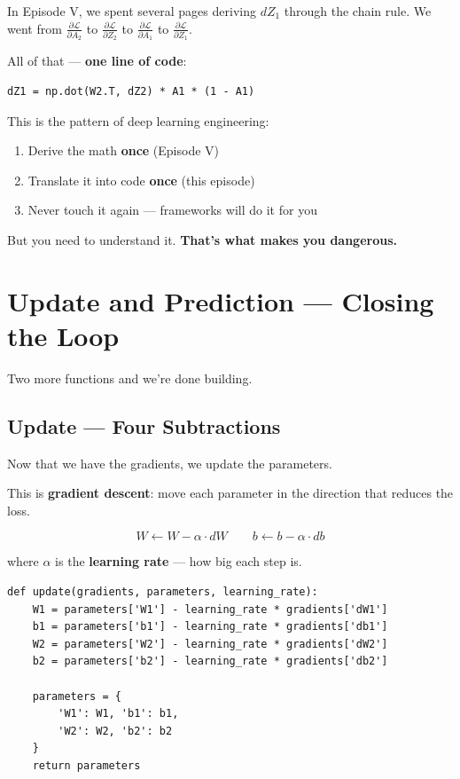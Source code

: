 \documentclass[11pt]{article}
\begin{document}
In Episode V, we spent several pages deriving $dZ_1$ through the chain rule.
We went from $\frac{\partial \mathcal{L}}{\partial A_2}$ to $\frac{\partial \mathcal{L}}{\partial Z_2}$ to $\frac{\partial \mathcal{L}}{\partial A_1}$ to $\frac{\partial \mathcal{L}}{\partial Z_1}$.

All of that --- \textbf{one line of code}:

\begin{lstlisting}
dZ1 = np.dot(W2.T, dZ2) * A1 * (1 - A1)
\end{lstlisting}

\begin{insightbox}[title=Theory $\to$ Code]
This is the pattern of deep learning engineering:
\begin{enumerate}
  \item Derive the math \textbf{once} (Episode V)
  \item Translate it into code \textbf{once} (this episode)
  \item Never touch it again --- frameworks will do it for you
\end{enumerate}

But you need to understand it. \textbf{That's what makes you dangerous.}
\end{insightbox}

\section{Update and Prediction --- Closing the Loop}

Two more functions and we're done building.

\subsection{Update --- Four Subtractions}

Now that we have the gradients, we update the parameters.

This is \textbf{gradient descent}: move each parameter in the direction that reduces the loss.

\[
W \leftarrow W - \alpha \cdot dW \qquad b \leftarrow b - \alpha \cdot db
\]

where $\alpha$ is the \textbf{learning rate} --- how big each step is.

\begin{lstlisting}
def update(gradients, parameters, learning_rate):
    W1 = parameters['W1'] - learning_rate * gradients['dW1']
    b1 = parameters['b1'] - learning_rate * gradients['db1']
    W2 = parameters['W2'] - learning_rate * gradients['dW2']
    b2 = parameters['b2'] - learning_rate * gradients['db2']

    parameters = {
        'W1': W1, 'b1': b1,
        'W2': W2, 'b2': b2
    }
    return parameters
\end{lstlisting}
\end{document}
